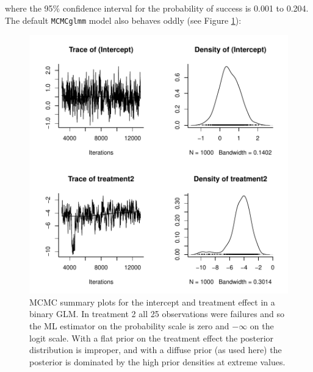 \documentclass{article}
\begin{document}
where the  95\% confidence interval for the probability of success is  0.001 to 0.204.\\

The default \texttt{MCMCglmm} model also behaves oddly (see Figure \ref{separation1-fig}):

\begin{Schunk}
\end{Schunk}



\begin{figure}[!h]
\begin{center}
\includegraphics{Lecture2-081}
\end{center}
\caption{MCMC summary plots for the intercept and treatment effect in a binary GLM. In treatment 2 all 25 observations were failures and so the ML estimator on the probability scale is zero and $-\infty$ on the logit scale. With a flat prior on the treatment effect the posterior distribution is improper, and with a diffuse prior (as used here) the posterior is dominated by the high prior densities at extreme values.}
\label{separation1-fig}
\end{figure}
\end{document}
